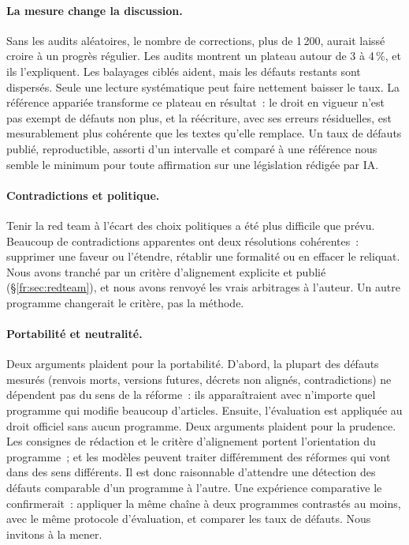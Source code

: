 \documentclass[11pt,a4paper]{article}
\begin{document}
\paragraph{La mesure change la discussion.}
Sans les audits aléatoires, le nombre de corrections, plus de 1\,200, aurait laissé croire à un progrès régulier. Les audits montrent un plateau autour de 3 à 4\,\%, et ils l'expliquent. Les balayages ciblés aident, mais les défauts restants sont dispersés. Seule une lecture systématique peut faire nettement baisser le taux. La référence appariée transforme ce plateau en résultat~: le droit en vigueur n'est pas exempt de défauts non plus, et la réécriture, avec ses erreurs résiduelles, est mesurablement plus cohérente que les textes qu'elle remplace. Un taux de défauts publié, reproductible, assorti d'un intervalle et comparé à une référence nous semble le minimum pour toute affirmation sur une législation rédigée par IA.

\paragraph{Contradictions et politique.}
Tenir la red team à l'écart des choix politiques a été plus difficile que prévu. Beaucoup de contradictions apparentes ont deux résolutions cohérentes~: supprimer une faveur ou l'étendre, rétablir une formalité ou en effacer le reliquat. Nous avons tranché par un critère d'alignement explicite et publié (\S\ref{fr:sec:redteam}), et nous avons renvoyé les vrais arbitrages à l'auteur. Un autre programme changerait le critère, pas la méthode.

\paragraph{Portabilité et neutralité.}
Deux arguments plaident pour la portabilité. D'abord, la plupart des défauts mesurés (renvois morts, versions futures, décrets non alignés, contradictions) ne dépendent pas du sens de la réforme~: ils apparaîtraient avec n'importe quel programme qui modifie beaucoup d'articles. Ensuite, l'évaluation est appliquée au droit officiel sans aucun programme. Deux arguments plaident pour la prudence. Les consignes de rédaction et le critère d'alignement portent l'orientation du programme~; et les modèles peuvent traiter différemment des réformes qui vont dans des sens différents. Il est donc raisonnable d'attendre une détection des défauts comparable d'un programme à l'autre. Une expérience comparative le confirmerait~: appliquer la même chaîne à deux programmes contrastés au moins, avec le même protocole d'évaluation, et comparer les taux de défauts. Nous invitons à la mener.
\end{document}
